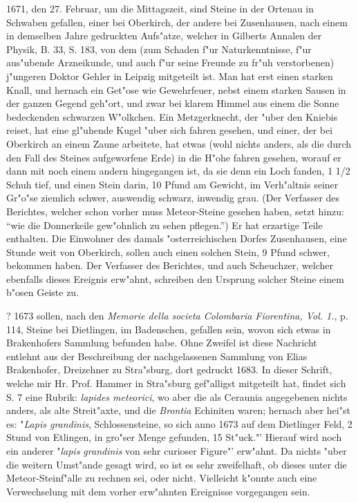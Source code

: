 \documentclass[a4paper, 11pt, oneside, polutonikogreek, german]{article}
\begin{document}
1671, den 27. Februar, um die Mittagszeit, sind Steine in der Ortenau in Schwaben gefallen, einer bei Oberkirch, der andere bei Zusenhausen, nach einem in demselben Jahre gedruckten Aufs"atze, welcher in Gilberts Annalen der Physik, B. 33, S. 183, von dem (zum Schaden f"ur Naturkenntnisse, f"ur aus"ubende Arzneikunde, und auch f"ur seine Freunde zu fr"uh verstorbenen) j"ungeren Doktor Gehler in Leipzig mitgeteilt ist. Man hat erst einen starken Knall, und hernach ein Get"ose wie Gewehrfeuer, nebst einem starken Sausen in der ganzen Gegend geh"ort, und zwar bei klarem Himmel aus einem die Sonne bedeckenden schwarzen W"olkchen. Ein Metzgerknecht, der "uber den Kniebis reiset, hat eine gl"uhende Kugel "uber sich fahren gesehen, und einer, der bei Oberkirch an einem Zaune arbeitete, hat etwas (wohl nichts anders, als die durch den Fall des Steines aufgeworfene Erde) in die H"ohe fahren gesehen, worauf er dann mit noch einem andern hingegangen ist, da sie denn ein Loch fanden, 1 1/2 Schuh tief, und einen Stein darin, 10 Pfund am Gewicht, im Verh"altnis seiner Gr"o"se ziemlich schwer, auswendig schwarz, inwendig grau. (Der Verfasser des Berichtes, welcher schon vorher muss Meteor-Steine gesehen haben, setzt hinzu: "`wie die Donnerkeile gew"ohnlich zu sehen pflegen."') Er hat erzartige Teile enthalten. Die Einwohner des damals "osterreichischen Dorfes Zusenhausen, eine Stunde weit von Oberkirch, sollen auch einen solchen Stein, 9 Pfund schwer, bekommen haben. Der Verfasser des Berichtes, und auch Scheuchzer, welcher ebenfalls dieses Ereignis erw"ahnt, schreiben den Ursprung solcher Steine einem b"osen Geiste zu.

? 1673 sollen, nach den \emph{Memorie della societa Colombaria Fiorentina, Vol. 1.}, p. 114, Steine bei Dietlingen, im Badenschen, gefallen sein, wovon sich etwas in Brakenhofers Sammlung befunden habe. Ohne Zweifel ist diese Nachricht entlehnt aus der Beschreibung der nachgelassenen Sammlung von Elias Brakenhofer, Dreizehner zu Stra"sburg, dort gedruckt 1683. In dieser Schrift, welche mir Hr. Prof. Hammer in Stra"sburg gef"alligst mitgeteilt hat, findet sich S. 7 eine Rubrik: \emph{lapides meteorici}, wo aber die als Ceraunia angegebenen nichts anders, als alte Streit"axte, und die \emph{Brontia} Echiniten waren; hernach aber hei"st es: "\emph{Lapis grandinis}, Schlossensteine, so sich anno 1673 auf dem Dietlinger Feld, 2 Stund von Etlingen, in gro"ser Menge gefunden, 15 St"uck."' Hierauf wird noch ein anderer "\emph{lapis grandinis} von sehr curioser Figure"' erw"ahnt. Da nichts "uber die weitern Umst"ande gesagt wird, so ist es sehr zweifelhaft, ob dieses unter die Meteor-Steinf"alle zu rechnen sei, oder nicht. Vielleicht k"onnte auch eine Verwechselung mit dem vorher erw"ahnten Ereignisse vorgegangen sein.
\end{document}

